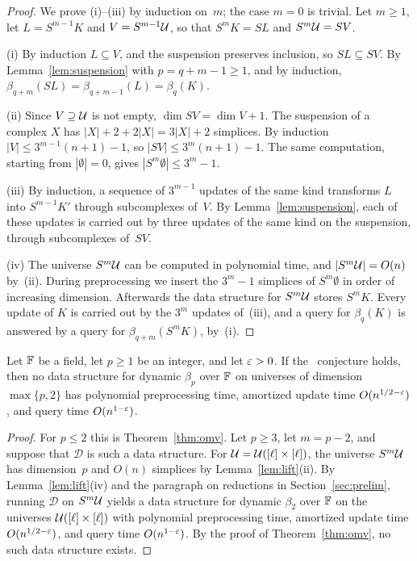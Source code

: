 \begin{proof}
We prove (i)--(iii) by induction on~$m$; the case $m=0$ is trivial.
Let $m\ge1$, let $L=S^{m-1}K$ and $V=S^{m-1}\mathcal{U}$, so that $S^mK=SL$ and $S^m\mathcal{U}=SV$.

(i) By induction $L\subseteq V$, and the suspension preserves inclusion, so $SL\subseteq SV$.
By Lemma~\ref{lem:suspension} with $p=q+m-1\ge1$, and by induction, $\beta_{q+m}(SL)=\beta_{q+m-1}(L)=\beta_q(K)$.

(ii) Since $V\supseteq\mathcal{U}$ is not empty, $\dim SV=\dim V+1$.
The suspension of a complex $X$ has $|X|+2+2|X|=3|X|+2$ simplices.
By induction $|V|\le3^{m-1}(n+1)-1$, so $|SV|\le3^m(n+1)-1$.
The same computation, starting from $|\emptyset|=0$, gives $|S^m\emptyset|\le3^m-1$.

(iii) By induction, a sequence of $3^{m-1}$ updates of the same kind transforms $L$ into $S^{m-1}K'$ through subcomplexes of~$V$.
By Lemma~\ref{lem:suspension}, each of these updates is carried out by three updates of the same kind on the suspension, through subcomplexes of~$SV$.

(iv) The universe $S^m\mathcal{U}$ can be computed in polynomial time, and $|S^m\mathcal{U}|=O(n)$ by~(ii).
During preprocessing we insert the $3^m-1$ simplices of $S^m\emptyset$ in order of increasing dimension.
Afterwards the data structure for $S^m\mathcal{U}$ stores $S^mK$.
Every update of $K$ is carried out by the $3^m$ updates of~(iii), and a query for $\beta_q(K)$ is answered by a query for $\beta_{q+m}(S^mK)$, by~(i).
\end{proof}

\begin{corollary}\label{cor:allp}
Let $\mathbb{F}$ be a field, let $p\ge1$ be an integer, and let $\varepsilon>0$.
If the \OMv\ conjecture holds, then no data structure for dynamic $\beta_p$ over $\mathbb{F}$ on universes of dimension $\max\{p,2\}$ has polynomial preprocessing time, amortized update time $O(n^{1/2-\varepsilon})$, and query time $O(n^{1-\varepsilon})$.
\end{corollary}

\begin{proof}
For $p\le2$ this is Theorem~\ref{thm:omv}.
Let $p\ge3$, let $m=p-2$, and suppose that $\mathcal{D}$ is such a data structure.
For $\mathcal{U}=\mathcal{U}([\ell]\times[\ell])$, the universe $S^m\mathcal{U}$ has dimension~$p$ and $O(n)$ simplices by Lemma~\ref{lem:lift}(ii).
By Lemma~\ref{lem:lift}(iv) and the paragraph on reductions in Section~\ref{sec:prelim}, running $\mathcal{D}$ on $S^m\mathcal{U}$ yields a data structure for dynamic $\beta_2$ over $\mathbb{F}$ on the universes $\mathcal{U}([\ell]\times[\ell])$ with polynomial preprocessing time, amortized update time $O(n^{1/2-\varepsilon})$, and query time $O(n^{1-\varepsilon})$.
By the proof of Theorem~\ref{thm:omv}, no such data structure exists.
\end{proof}

